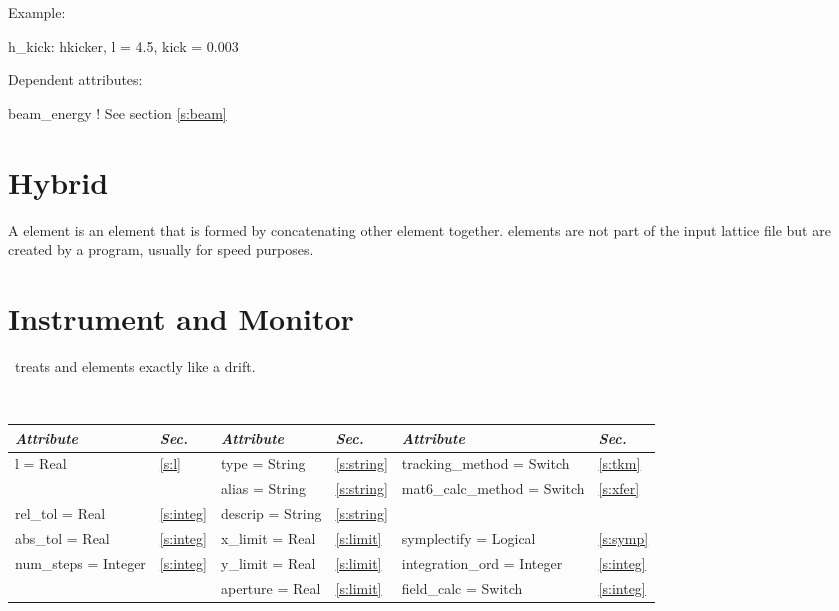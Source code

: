 \vskip0.05in \noindent
Example:
\begin{example}
  h_kick: hkicker, l = 4.5, kick = 0.003
\end{example}

\vskip0.05in \noindent
Dependent attributes:
\begin{example}
  beam\_energy  ! See section \ref{s:beam}
\end{example}

\section{Hybrid}
\label{s:hybrid}

A  element is an element that is formed by concatenating
other element together.  elements are not part of the input
lattice file but are created by a program, usually for speed purposes.

\section{Instrument and Monitor}
\label{s:monitor}

\bmad\ treats  and  elements exactly like
a drift.

\toffset
\begin{center}
\tt
\begin{tabular}{|l|l||l|l||l|l|} \hline
  {\sl Attribute} & {\sl Sec.}  & {\sl Attribute} & {\sl Sec.} & {\sl Attribute} & {\sl Sec.} \\ \hline
  l        = Real       & \ref{s:l}     & type = String      & \ref{s:string} & tracking\_method = Switch    & \ref{s:tkm}   \\ \hline
                        &               & alias = String     & \ref{s:string} & mat6\_calc\_method = Switch  & \ref{s:xfer}  \\ \hline
  rel\_tol = Real       & \ref{s:integ} & descrip = String   & \ref{s:string} &                              &               \\ \hline
  abs\_tol = Real       & \ref{s:integ} & x\_limit = Real    & \ref{s:limit}  & symplectify = Logical        & \ref{s:symp}  \\ \hline
  num\_steps = Integer  & \ref{s:integ} & y\_limit = Real    & \ref{s:limit}  & integration\_ord = Integer   & \ref{s:integ} \\ \hline
                        &               & aperture = Real    & \ref{s:limit}  & field\_calc = Switch         & \ref{s:integ} \\ \hline
\end{tabular}
\end{center}
\toffset

